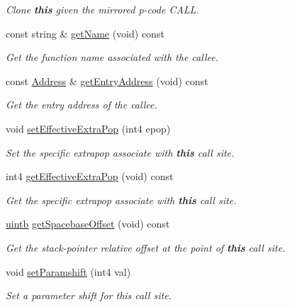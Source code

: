 \begin{DoxyCompactItemize}
\begin{DoxyCompactList}\small\item\em Clone {\bfseries{this}} given the mirrored p-\/code C\+A\+LL. \end{DoxyCompactList}\item 
const string \& \mbox{\hyperlink{class_func_call_specs_a5c5bb2445140cdde864320679ba347b0}{get\+Name}} (void) const
\begin{DoxyCompactList}\small\item\em Get the function name associated with the callee. \end{DoxyCompactList}\item 
const \mbox{\hyperlink{class_address}{Address}} \& \mbox{\hyperlink{class_func_call_specs_a0a5d18be6037559397af11e6764abbcd}{get\+Entry\+Address}} (void) const
\begin{DoxyCompactList}\small\item\em Get the entry address of the callee. \end{DoxyCompactList}\item 
void \mbox{\hyperlink{class_func_call_specs_a41d9cc82055fdcbc01f0a37ae3a56a01}{set\+Effective\+Extra\+Pop}} (int4 epop)
\begin{DoxyCompactList}\small\item\em Set the specific {\itshape extrapop} associate with {\bfseries{this}} call site. \end{DoxyCompactList}\item 
int4 \mbox{\hyperlink{class_func_call_specs_ade3352e35ffd4ed59bbc78f4b43c2998}{get\+Effective\+Extra\+Pop}} (void) const
\begin{DoxyCompactList}\small\item\em Get the specific {\itshape extrapop} associate with {\bfseries{this}} call site. \end{DoxyCompactList}\item 
\mbox{\hyperlink{types_8h_a2db313c5d32a12b01d26ac9b3bca178f}{uintb}} \mbox{\hyperlink{class_func_call_specs_ad8990f080a96809b347656d7331236c5}{get\+Spacebase\+Offset}} (void) const
\begin{DoxyCompactList}\small\item\em Get the stack-\/pointer relative offset at the point of {\bfseries{this}} call site. \end{DoxyCompactList}\item 
void \mbox{\hyperlink{class_func_call_specs_ac1c86fdb931fd085ca45ff39a091552a}{set\+Paramshift}} (int4 val)
\begin{DoxyCompactList}\small\item\em Set a parameter shift for this call site. \end{DoxyCompactList}\item 

\end{DoxyCompactItemize}
